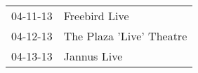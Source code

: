 \begin{supertabular}{p{0.25\columnwidth}p{0.75\columnwidth}}
 04-11-13 &             Freebird Live \\
 04-12-13 &  The Plaza 'Live' Theatre \\
 04-13-13 &               Jannus Live \\
\end{supertabular}
